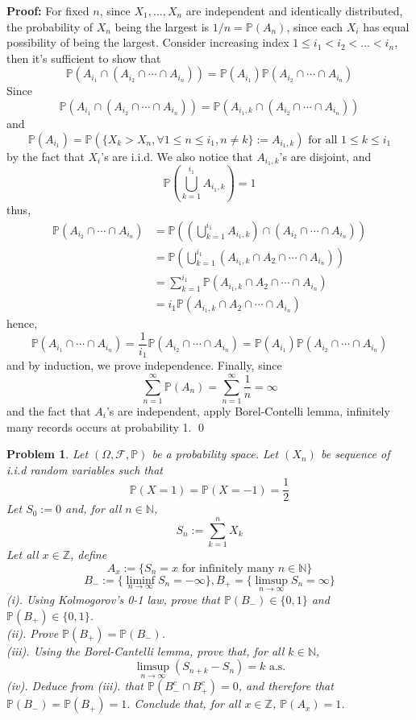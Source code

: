 \documentclass[12pt]{article}
\newtheorem{problem}{Problem}
\begin{document}
\textbf{Proof:} For fixed $n$, since $X_{1}, \dots, X_n$ are independent and identically distributed, the probability of $X_n$ being the largest is $1/n=\mathbb{P}(A_n)$, since each $X_i$ has equal possibility of being the largest. Consider increasing index $1\leq i_1<i_2<\dots<i_n$, then it's sufficient to show that 
$$
    \mathbb{P}(A_{i_1}\cap(A_{i_2}\cap\cdots\cap A_{i_n}))=\mathbb{P}(A_{i_1})\mathbb{P}(A_{i_2}\cap\cdots\cap A_{i_n})
$$
Since 
$$
    \mathbb{P}(A_{i_1}\cap(A_{i_2}\cap\cdots\cap A_{i_n}))=\mathbb{P}(A_{i_1, k}\cap(A_{i_2}\cap\cdots\cap A_{i_n}))
$$
and
$$
    \mathbb{P}(A_{i_1})=\mathbb{P}(\{X_k>X_n, \forall 1\leq n\leq i_1, n\neq k\}:= A_{i_1, k}) \text{ for all } 1\leq k\leq i_1
$$ 
by the fact that $X_i$'s are i.i.d. We also notice that $A_{i_1, k}$'s are disjoint, and 
$$
    \mathbb{P}\left(\bigcup_{k=1}^{i_1}A_{i_1, k}\right)= 1
$$
thus, 
\begin{align*}
    \mathbb{P}(A_{i_2}\cap\cdots\cap A_{i_n})&=\mathbb{P}\left(\left(\bigcup_{k=1}^{i_1}A_{i_1, k}\right)\cap(A_{i_2}\cap\cdots\cap A_{i_{n}})\right) \\
    &=\mathbb{P}\left(\bigcup_{k=1}^{i_1}(A_{i_1, k}\cap A_2\cap\cdots\cap A_{i_n})\right) \\
    &=\sum_{k=1}^{i_1}\mathbb{P}(A_{i_1, k}\cap A_2\cap\cdots\cap A_{i_n}) \\
    &= i_1\mathbb{P}(A_{i_1, k}\cap A_2\cap\cdots\cap A_{i_n})
\end{align*}
hence, 
$$
    \mathbb{P}(A_{i_1}\cap\cdots\cap A_{i_n})=\frac{1}{i_1}\mathbb{P}(A_{i_2}\cap\cdots\cap A_{i_n})=\mathbb{P}(A_{i_1})\mathbb{P}(A_{i_2}\cap\cdots\cap A_{i_n})
$$
and by induction, we prove independence. Finally, since 
$$
    \sum_{n=1}^\infty\mathbb{P}(A_n)=\sum_{n=1}^\infty\frac{1}{n}=\infty
$$ and the fact that $A_i$'s are independent, apply Borel-Contelli lemma, infinitely many records occurs at probability 1. \qed
\\
\begin{problem}
    Let $(\Omega, \mathcal{F}, \mathbb{P})$ be a probability space. Let $(X_n)$ be sequence of i.i.d random variables such that 
    $$
        \mathbb{P}(X=1)=\mathbb{P}(X=-1)=\frac{1}{2}
    $$
    Let $S_0:=0$ and, for all $n\in\mathbb{N}$, 
    $$
        S_n:=\sum_{k=1}^n X_k
    $$
    Let all $x\in\mathbb{Z}$, define
    $$
        A_x:= \{S_n=x\text{ for infinitely many } n\in\mathbb{N}\}
    $$
    $$
        B_-:=\{\liminf_{n\to\infty} S_n=-\infty\}, B_+=\{\limsup_{n\to\infty} S_n=\infty\}
    $$
    \indent (i). Using Kolmogorov's 0-1 law, prove that $\mathbb{P}(B_-)\in\{0,1\}$ and $\mathbb{P}(B_+)\in\{0,1\}$. \\
    \indent (ii). Prove $\mathbb{P}(B_+)=\mathbb{P}(B_-)$. \\
    \indent (iii). Using the Borel-Cantelli lemma, prove that, for all $k\in\mathbb{N}$, 
    $$
        \limsup_{n\to\infty}(S_{n+k}-S_n)=k \text{ a.s.}
    $$
    \indent (iv). Deduce from (iii). that $\mathbb{P}(B_-^c\cap B_+^c)=0$, and therefore that $\mathbb{P}(B_-)=\mathbb{P}(B_+)=1$. Conclude that, for all $x\in\mathbb{Z}$, $\mathbb{P}(A_x)=1$.
\end{problem}
\end{document}
